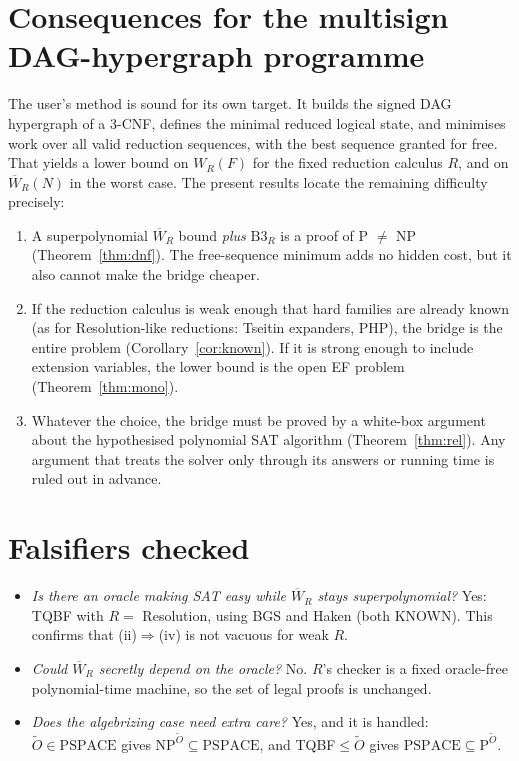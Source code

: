 \documentclass[11pt]{article}
\theoremstyle{definition}
\begin{document}
\section{Consequences for the multisign DAG-hypergraph programme}
The user's method is sound for its own target. It builds the signed DAG hypergraph of a
3-CNF, defines the minimal reduced logical state, and minimises work over all valid
reduction sequences, with the best sequence granted for free. That yields a lower bound
on $W_R(F)$ for the fixed reduction calculus $R$, and on $\overline W_R(N)$ in the worst
case. The present results locate the remaining difficulty precisely:
\begin{enumerate}
\item A superpolynomial $\overline W_R$ bound \emph{plus} $\mathrm{B3}_R$ is a proof of
P $\ne$ NP (Theorem~\ref{thm:dnf}). The free-sequence minimum adds no hidden cost, but it
also cannot make the bridge cheaper.
\item If the reduction calculus is weak enough that hard families are already known (as
for Resolution-like reductions: Tseitin expanders, PHP), the bridge is the entire
problem (Corollary~\ref{cor:known}). If it is strong enough to include extension
variables, the lower bound is the open EF problem (Theorem~\ref{thm:mono}).
\item Whatever the choice, the bridge must be proved by a white-box argument about the
hypothesised polynomial SAT algorithm (Theorem~\ref{thm:rel}). Any argument that treats
the solver only through its answers or running time is ruled out in advance.
\end{enumerate}

\section*{Falsifiers checked}
\begin{itemize}
\item[F1] \emph{Is there an oracle making SAT easy while $\overline W_R$ stays
superpolynomial?} Yes: TQBF with $R=$ Resolution, using BGS and Haken (both KNOWN). This
confirms that (ii)$\Rightarrow$(iv) is not vacuous for weak $R$.
\item[F2] \emph{Could $\overline W_R$ secretly depend on the oracle?} No. $R$'s checker
is a fixed oracle-free polynomial-time machine, so the set of legal proofs is unchanged.
\item[F3] \emph{Does the algebrizing case need extra care?} Yes, and it is handled:
$\widetilde O\in\mathrm{PSPACE}$ gives $\mathrm{NP}^{\widetilde O}\subseteq\mathrm{PSPACE}$,
and TQBF$\le\widetilde O$ gives $\mathrm{PSPACE}\subseteq\mathrm P^{\widetilde O}$.
\end{itemize}
\end{document}

